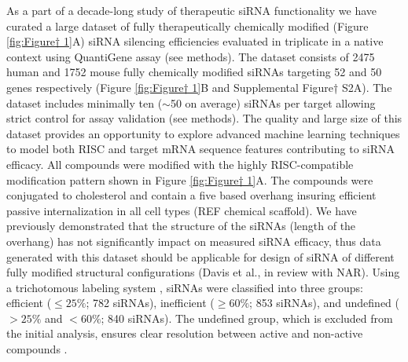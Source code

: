 \documentclass{report}
\begin{document}
As a part of a decade-long study of therapeutic siRNA functionality we have curated a large dataset of fully therapeutically chemically modified (Figure \ref{fig:Figure† 1}A) siRNA silencing efficiencies evaluated in triplicate in a native context using QuantiGene assay (see methods). The dataset consists of 2475 human and 1752 mouse fully chemically modified siRNAs targeting 52 and 50 genes respectively (Figure \ref{fig:Figure† 1}B and Supplemental Figure† S2A). The dataset includes minimally ten ($\sim$50 on average) siRNAs per target allowing strict control for assay validation (see methods). The quality and large size of this dataset provides an opportunity to explore advanced machine learning techniques to model both RISC and target mRNA sequence features contributing to siRNA efficacy. 
All compounds were modified with the highly RISC-compatible modification pattern shown in Figure \ref{fig:Figure† 1}A. The compounds were conjugated to cholesterol and contain a five based overhang insuring efficient passive internalization in all cell types (REF chemical scaffold). We have previously demonstrated that the structure of the siRNAs (length of the overhang) has not significantly impact on measured siRNA efficacy, thus data generated with this dataset should be applicable for design of siRNA of different fully modified structural configurations (Davis et al., in review with NAR). Using a trichotomous labeling system \cite{monopoli_asymmetric_2023}, siRNAs were classified into three groups: efficient ($\leq25\%$; 782 siRNAs), inefficient ($\geq60\%$; 853 siRNAs), and undefined ($>25\%$ and $<60\%$; 840 siRNAs). The undefined group, which is excluded from the initial analysis, ensures clear resolution between active and non-active compounds \cite{monopoli_asymmetric_2023}.
\end{document}
